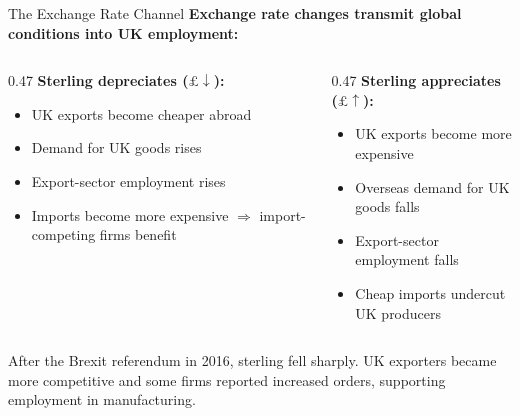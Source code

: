\documentclass[16pt,aspectratio=169]{beamer}
\begin{document}
\begin{frame}{The Exchange Rate Channel}
    \textbf{Exchange rate changes transmit global conditions into UK employment:}

    \vspace{0.5em}
    \begin{columns}
        \begin{column}{0.47\textwidth}
            \textbf{Sterling depreciates ($\pounds \downarrow$):}
            \begin{itemize}
                \item UK exports become cheaper abroad
                \item Demand for UK goods rises
                \item Export-sector employment rises
                \item Imports become more expensive $\Rightarrow$ import-competing firms benefit
            \end{itemize}
        \end{column}
        \begin{column}{0.47\textwidth}
            \textbf{Sterling appreciates ($\pounds \uparrow$):}
            \begin{itemize}
                \item UK exports become more expensive
                \item Overseas demand for UK goods falls
                \item Export-sector employment falls
                \item Cheap imports undercut UK producers
            \end{itemize}
        \end{column}
    \end{columns}

    \vspace{0.5em}
    \begin{example}
        After the Brexit referendum in 2016, sterling fell sharply. UK exporters became more competitive and some firms reported increased orders, supporting employment in manufacturing.
    \end{example}
\end{frame}
\end{document}
